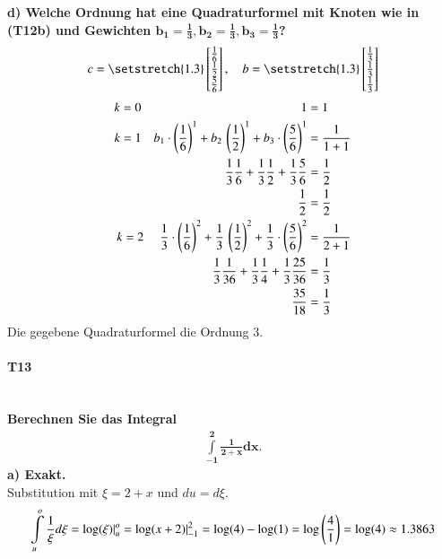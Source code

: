 \documentclass[10pt,a4paper]{article}
\begin{document}
    \textbf{%
        d) Welche Ordnung hat eine Quadraturformel mit Knoten wie in (T12b) und Gewichten $\mathbf{b_1=\frac{1}{3}, b_2=\frac{1}{3}, b_3=\frac{1}{3}}$?
    }\\
	\begin{align*}
		c = \begingroup %
			\setstretch{1.3}
			\begin{bmatrix}
				\frac{1}{6} \\
				\frac{1}{2} \\
				\frac{5}{6}
			\end{bmatrix}
			\endgroup,  \quad
		b = \begingroup %
			\setstretch{1.3}
			\begin{bmatrix}
				\frac{1}{3} \\
				\frac{1}{3} \\
				\frac{1}{3}
			\end{bmatrix}
			\endgroup
	\end{align*}
	\begin{align*}
		k=0 \hspace{4.5cm}1&=1 \\
		k=1  \quad  b_1\cdot \left( \frac{1}{6}\right)^1+  b_2  \, \left(\frac{1}{2} \right)^1+  b_3\cdot\left( \frac{5}{6}\right)^1 & = \frac{1}{1+1} \\
		\frac{1}{3}\frac{1}{6}+ \frac{1}{3}  \frac{1}{2} + \frac{1}{3} \frac{5}{6}                                                   & = \frac{1}{2} \\
		\frac{1}{2} & = \frac{1}{2} \\
		k=2 \hspace{0.1cm} \quad  \frac{1}{3}\cdot \left( \frac{1}{6}\right)^2+  \frac{1}{3}  \, \left(\frac{1}{2} \right)^2+  \frac{1}{3}\cdot\left( \frac{5}{6}\right)^2 & = \frac{1}{2+1} \\
		\frac{1}{3}\frac{1}{36}+  \frac{1}{3}  \frac{1}{4} + \frac{1}{3} \frac{25}{36} & = \frac{1}{3} \\
		\frac{35}{18} &= \frac{1}{3}
	\end{align*}
	Die gegebene Quadraturformel die Ordnung 3.
    \pagebreak
    \paragraph{T13}\mbox{}\\
    \textbf{%
        Berechnen Sie das Integral
        \begin{align*}
            \mathbf{\int\limits_{-1}^{2}\frac{1}{2+x}dx}.
        \end{align*}
        a) Exakt.}\\
        Substitution mit $\xi=2+x$ und $du=d\xi$.
        \begin{align*}
            \int\limits_{u}^{o}\frac{1}{\xi}d\xi = \text{log}(\xi)\arrowvert^o_u = \text{log}(x+2)\arrowvert^2_{-1} = \text{log}(4)-\text{log}(1) = \text{log}\left(\frac{4}{1}\right)=\text{log}(4)\approx1.3863
        \end{align*}
        
\end{document}
